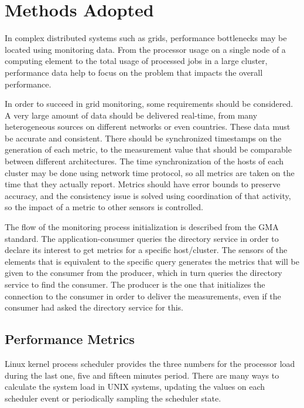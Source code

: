 
\section{Methods Adopted}

In complex distributed systems such as grids, performance bottlenecks may be located using monitoring data. From the processor usage on a single node of a computing element to the total usage of processed jobs in a large cluster, performance data help to focus on the problem that impacts the overall performance.

In order to succeed in grid monitoring, some requirements should be considered. A very large amount of data should be delivered real-time, from many heterogeneous sources on different networks or even countries. These data must be accurate and consistent. There should be synchronized timestamps on the generation of each metric, to the measurement value that should be comparable between different architectures. The time synchronization of the hosts of each cluster may be done using network time protocol, so all metrics are taken on the time that they actually report. Metrics should have error bounds to preserve accuracy, and the consistency issue is solved using coordination of that activity, so the impact of a metric to other sensors is controlled.

The flow of the monitoring process initialization is described from the GMA standard. The application-consumer queries the directory service in order to declare its interest to get metrics for a specific host/cluster. The sensors of the elements that is equivalent to the specific query generates the metrics that will be given to the consumer from the producer, which in turn queries the directory service to find the consumer. The producer is the one that initializes the connection to the consumer in order to deliver the measurements, even if the consumer had asked the directory service for this. \cite{balatonuse}


\subsection{Performance Metrics}

Linux kernel process scheduler provides the three numbers for the processor load during the last one, five and fifteen minutes period. There are many ways to calculate the system load in UNIX systems, updating the values on each scheduler event or periodically sampling the scheduler state.

